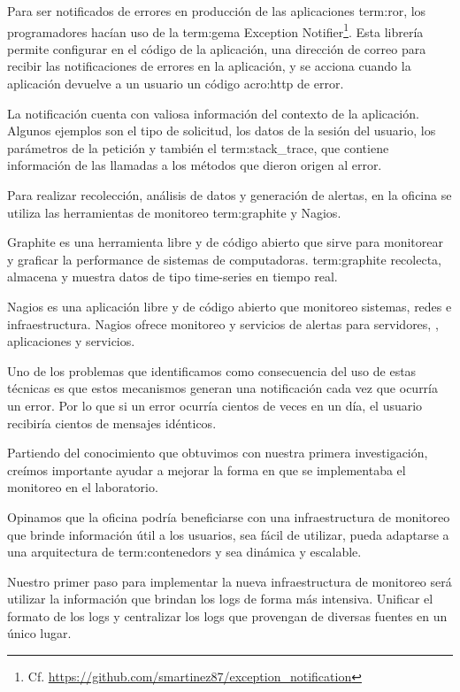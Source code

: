 Para ser notificados de errores en producción de las aplicaciones
\gls{term:ror}, los programadores hacían uso de la \gls{term:gema} Exception
Notifier\footnote{Cf.
\url{https://github.com/smartinez87/exception_notification}}. Esta librería
permite configurar en el código de la aplicación, una dirección de correo para
recibir las notificaciones de errores en la aplicación, y se acciona cuando la
aplicación devuelve a un usuario un código \gls{acro:http} de error.

La notificación cuenta con valiosa información del contexto de la aplicación.
Algunos ejemplos son el tipo de solicitud, los datos de la sesión del usuario,
los parámetros de la petición y también el \gls{term:stack_trace}, que contiene
información de las llamadas a los métodos que dieron origen al error.

Para realizar recolección, análisis de datos y generación de alertas, en la
oficina se utiliza las herramientas de monitoreo \gls{term:graphite} y Nagios.

Graphite es una herramienta libre y de código abierto que sirve para monitorear
y graficar la performance de sistemas de computadoras. \gls{term:graphite} recolecta,
almacena y muestra datos de tipo time-series en tiempo real.

Nagios es una aplicación libre y de código abierto que monitoreo sistemas,
redes e infraestructura. Nagios ofrece monitoreo y servicios de alertas para
servidores, , aplicaciones y servicios.

Uno de los problemas que identificamos como consecuencia del uso de estas
técnicas es que estos mecanismos generan una notificación cada vez que ocurría
un error. Por lo que si un error ocurría cientos de veces en un día, el usuario
recibiría cientos de mensajes idénticos.

Partiendo del conocimiento que obtuvimos con nuestra primera investigación,
creímos importante ayudar a mejorar la forma en que se implementaba el
monitoreo en el laboratorio.

Opinamos que la oficina podría beneficiarse con una infraestructura de
monitoreo que brinde información útil a los usuarios, sea fácil de utilizar,
pueda adaptarse a una arquitectura de \glspl{term:contenedor} y sea dinámica y
escalable.

Nuestro primer paso para implementar la nueva infraestructura de monitoreo será
utilizar la información que brindan los logs de forma más intensiva. Unificar
el formato de los logs y centralizar los logs que provengan de diversas fuentes
en un único lugar.

